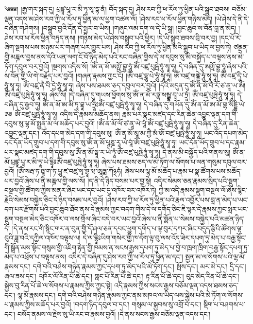 \setcounter{footnote}{0} 
༄༅༅། །རྒྱ་གར་སྐད་དུ། པྲཛྙཱ་པཱ་ར་མི་ཏཱ་སཱ་དྷ་ནཾ། བོད་སྐད་དུ། ཤེས་རབ་ཀྱི་ཕ་རོལ་ཏུ་ཕྱིན་པའི་སྒྲུབ་ཐབས། བཅོམ་ལྡན་འདས་མ་ཤེས་རབ་ཀྱི་ཕ་རོལ་ཏུ་ཕྱིན་མ་ལ་ཕྱག་འཚལ་ལོ། །ཤེས་རབ་ཕ་རོལ་ཕྱིན་གཉིས་མེད། །ཡེ་ཤེས་དེ་ནི་དེ་བཞིན་གཤེགས། །བསྒྲུབ་བྱའི་དོན་དེ་སྦྱར་བ་ཡིས། །གཞུང་ལམ་དག་ལ་དེ་ཡི་སྒྲ། །བྱང་ཆུབ་ས་བོན་བླ་ན་མེད། །ཤེས་རབ་ཕ་རོལ་ཕྱིན་བཏུད་ནས། །གཉིས་མེད་ཡེ་ཤེས་བསྒྲུབ་པའི་ཕྱིར། །དེ་ཡི་སྒྲུབ་ཐབས་བྲི་བར་བྱ། །དང་པོ་རེ་ཞིག་སྔགས་པས་མཉམ་པར་གཞག་པར་གྱུར་པས། ཤེས་རབ་ཀྱི་ཕ་རོལ་ཏུ་ཕྱིན་མའི་སྒྲུབ་པ་ཡིད་ལ་བྱས་ཏེ། ཙནྡན་གྱི་མཎྜལ་བྱས་ནས་དེའི་ཡན་ལག་ངོ་བོ་ཉིད་མེད་པའི་རང་བཞིན་གྱིས་དེ་ལ་དབུས་སུ་མི་བསྐྱོད་པ་བལྟས་ནས་མེ་ཏོག་དབུལ་བར་བྱའོ། །སྔགས་འདིས་སོ། །ཨོཾ་ན་མོ་ཨཀྵོ་བྷྱ་ཧཱུཾ་ཨོཾ་བཛྲ་པུཥྤེ་ཧཱུཾ་སྭཱ་ཧཱ། དེ་བཞིན་དུ་ཨཀྵོ་བྷྱ་ཧཱུཾ་ཞེས་པའི་ས་བོན་གྱི་ཡི་གེ་བརྗོད་པར་བྱའོ། །གཞན་རྣམས་ཀྱང་ངོ། །ཨོཾ་བཛྲ་དྷཱུ་པེ་ཧཱུཾ་སྭཱ་ཧཱ། ཨོཾ་བཛྲ་གནྡྷེ་ཧཱུཾ་སྭཱ་ཧཱ། ཨོཾ་བཛྲ་དཱི་པེ་ཧཱུཾ་སྭཱ་ཧཱ། ཨོཾ་བཛྲ་ནཻ་བི་དྱེ་ཧཱུཾ་སྭཱ་ཧཱ། ཞེས་པས་ཐམས་ཅད་དབུལ་བར་བྱའོ། །དེའི་མདུན་དུ་ཨོཾ་ན་མོ་བཻ་རོ་ཙ་ནཱ་ཡ་ཨོཾ། ཨོཾ་བཛྲ་པུཥྤེ་ཧཱུཾ་སྭཱ་ཧཱ། ཞེས་སོ། །དེ་བཞིན་དུ་གཡས་ཕྱོགས་སུ་ཨོཾ་ན་མོ་རཏྣ་སམྦྷ་བཱ་ཡ་ཏྲཱཾ། ཨོཾ་བཛྲ་པུཥྤེ་ཧཱུཾ་སྭཱ་ཧཱ། དེ་བཞིན་དུ་རྒྱབ་ཏུ། ཨོཾ་ན་མོ་ཨ་མི་ཏཱ་བྷཱ་ཡ་ཧྲཱིཿཨོཾ་བཛྲ་པུཥྤེ་ཧཱུཾ་སྭཱ་ཧཱ། དེ་བཞིན་དུ་གཡོན་དུ་ཨོཾ་ན་མོ་ཨ་མོ་གྷ་སིདྡྷི་ཡེ་ཨཿ ཨོཾ་བཛྲ་པུཥྤེ་ཧཱུཾ་སྭཱ་ཧཱ། འདིས་དེ་རྣམས་མཆོད་ནས། རྣམ་པར་སྣང་མཛད་དང་རིན་ཆེན་འབྱུང་ལྡན་དག་གི་དབུས་སུ་ལྷ་མོ་སྤྱན་མ་ལ་མཆོད་པར་བྱའོ། །ཨོཾ་ན་མོ་ལོ་ཙ་ནཱ་ཡེ་ལཱཾ་ཨོཾ་བཛྲ་པུཥྤེ་ཧཱུཾ་སྭཱ་ཧཱ། དེ་བཞིན་དུ་རིན་ཆེན་འབྱུང་ལྡན་དང་། འོད་དཔག་མེད་དག་གི་དབུས་སུ། ཨོཾ་ན་མོ་མཱ་མ་ཀྱཻ་མཾ་ཨོཾ་བཛྲ་པུཥྤེ་ཧཱུཾ་སྭཱ་ཧཱ། ཡང་འོད་དཔག་མེད་དང་དོན་ཡོད་གྲུབ་པ་དག་གི་དབུས་སུ་ཨོཾ་ན་མོ་པཱཎྜ་རཱ་ཡེ་བཱཾ་ཨོཾ་བཛྲ་པུཥྤེ་ཧཱུཾ་སྭཱ་ཧཱ། ཡང་དོན་ཡོད་གྲུབ་པ་དང་རྣམ་པར་སྣང་མཛད་དག་གི་དབུས་སུ་ཨོཾ་ན་མོ་སྟཱ་ར་ཡེ་ཏཱཾ་ཨོཾ་བཛྲ་པུཥྤེ་ཧཱུཾ་སྭཱ་ཧཱ། དེ་ནས་མི་བསྐྱོད་པའི་གནས་སུ། ཨོཾ་ན་མོ་པྲཛྙཱ་པཱ་ར་མི་ཏཱ་ཡེ་དྷཱིཿཨོཾ་བཛྲ་པུཥྤེ་ཧཱུཾ་སྭཱ་ཧཱ། ཞེས་པས་ཐམས་ཅད་ལ་མེ་ཏོག་ལ་སོགས་པ་ལན་གསུམ་དབུལ་བར་བྱའོ། །ཨོཾ་སརྦ་ཏ་ཐཱ་ག་ཏ་པཱུ་ཛ་བཛྲ་སྭ་བྷཱ་ཝ་ཨཱཏྨ་ཀོ྅ཧཾ། ཞེས་པས་ལྷ་མོ་མཆོད་པ་རྣམ་པ་སྣ་ཚོགས་པས་མཆོད་པར་བྱའོ་ཞེས་པ་ནི་མཎྜལ་གྱི་ལས་སོ། །ད་ནི་དེ་ཉིད་བསམ་པར་བྱ་སྟེ། འདིར་སེམས་ཅན་རྣམས་སྲིད་པའི་སྡུག་བསྔལ་གྱི་ཚོགས་ཀྱིས་མནར་ཞིང་ཡང་དང་ཡང་དུ་འཁོར་བར་འཁོར་ཏེ། ཀྱེ་མ་འདི་རྣམས་སྡུག་བསྔལ་ལོ་ཞེས་སྙིང་རྗེའི་སེམས་བསྐྱེད་ཅིང་དེ་ཉིད་བསམ་པར་བྱའོ། །ཤེས་རབ་ཀྱི་ཕ་རོལ་ཏུ་ཕྱིན་པའི་རྣལ་འབྱོར་པས་བླ་ན་མེད་པ་ཡང་དག་པར་རྫོགས་པའི་བྱང་ཆུབ་ཐོབ་ནས་དེ་རྣམས་ཀྱང་བདག་གིས་དེ་ལ་དགོད་ཅིང་ཇི་ལྟར་དེ་རྣམས་ཀྱང་སླར་ཡང་སྡུག་བསྔལ་མེད་ཅིང་འཁོར་བ་ལས་གྲོལ་ཞིང་བདེ་བར་ཡང་བྱའོ་ཞེས་པ་ནི་སྨོན་པ་སེམས་བསྐྱེད་པའི་མཚན་ཉིད་དོ། །དེ་ནས་རང་གི་སྙིང་གར་ན་བུན་གྱི་དོ་ཤལ་ཅན་དབང་ཕྱུག་དགོད་པ་ལྟ་བུར་དཀར་ཞིང་བདུད་རྩིའི་ཚོགས་ལྟ་བུའི་ཟླ་བའི་དཀྱིལ་འཁོར་བལྟས་ལ། དེ་ལ་དྷཱིཿཡིག་གསེར་གྱི་ཁ་དོག་ལྟ་བུ་ལས་འོད་ཟེར་དཔག་ཏུ་མེད་པ་བརྒྱ་སྟོང་གི་སྒྲོན་མས་སྟོང་གསུམ་གྱི་འཇིག་རྟེན་གྱི་ཁམས་ན་སངས་རྒྱས་དཔག་ཏུ་མེད་པ་བྱེ་བ་ཁྲག་ཁྲིག་བརྒྱ་སྟོང་དཔག་ཏུ་མེད་པ་འཕྲོས་པ་བལྟས་ནས། འདིར་དེ་བཞིན་དུ་ཤེས་རབ་ཀྱི་ཕ་རོལ་ཏུ་ཕྱིན་མ་དང་། སྤྱན་མ་ལ་སོགས་པའི་ལྷ་མོ་རྣམས་དང་། དགེ་བའི་བཤེས་གཉེན་རྣམས་ཀྱང་དཔག་ཏུ་མེད་པའི་མེ་ཏོག་དང་། སྤོས་དང་། མར་མེ་དང་། དྲི་དང་། ཞལ་ཟས་དང་། འཁོར་ལོ་རིན་པོ་ཆེ་དང་། གླང་པོ་རིན་པོ་ཆེ་དང་། རྟ་རིན་པོ་ཆེ་དང་། བུད་མེད་རིན་པོ་ཆེ་དང་། སྐྱེས་བུ་རིན་པོ་ཆེ་ལ་སོགས་པ་རྣམས་ཀྱིས་ཀྱང་སྟེ། འདི་རྣམས་ཀྱིས་སངས་རྒྱས་བཅོམ་ལྡན་འདས་ཐམས་ཅད་དང་། ལྷ་མོ་རྣམས་དང་། དགེ་བའི་བཤེས་གཉེན་རྣམས་ཀྱང་ནམ་མཁའ་ལ་ཡིད་ལས་སྐྱེས་པའི་མེ་ཏོག་ལ་སོགས་པ་རྣམས་ཀྱིས་མཆོད་པར་བྱའོ། །བདག་ཉིད་དབུལ་བ་དང་། གསུམ་ལ་སྐྱབས་སུ་འགྲོ་བ་དང་། སྡིག་པ་བཤགས་པ་དང་། བསོད་ནམས་ལ་རྗེས་སུ་ཡི་རང་བ་རྣམས་བྱའོ། །དེ་ནས་སངས་རྒྱས་བཅོམ་ལྡན་འདས་དང་། 